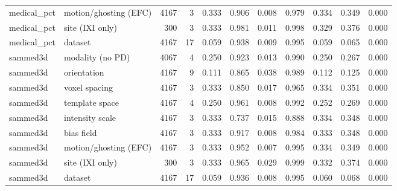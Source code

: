 \begin{tabular}{llrrrrrrrrr}
medical\_pct & motion/ghosting (EFC) & 4167 & 3 & 0.333 & 0.906 & 0.008 & 0.979 & 0.334 & 0.349 & 0.000 \\
medical\_pct & site (IXI only) & 300 & 3 & 0.333 & 0.981 & 0.011 & 0.998 & 0.329 & 0.376 & 0.000 \\
medical\_pct & dataset & 4167 & 17 & 0.059 & 0.938 & 0.009 & 0.995 & 0.059 & 0.065 & 0.000 \\
sammed3d & modality (no PD) & 4067 & 4 & 0.250 & 0.923 & 0.013 & 0.990 & 0.250 & 0.267 & 0.000 \\
sammed3d & orientation & 4167 & 9 & 0.111 & 0.865 & 0.038 & 0.989 & 0.112 & 0.125 & 0.000 \\
sammed3d & voxel spacing & 4167 & 3 & 0.333 & 0.850 & 0.017 & 0.965 & 0.334 & 0.351 & 0.000 \\
sammed3d & template space & 4167 & 4 & 0.250 & 0.961 & 0.008 & 0.992 & 0.252 & 0.269 & 0.000 \\
sammed3d & intensity scale & 4167 & 3 & 0.333 & 0.737 & 0.015 & 0.888 & 0.334 & 0.348 & 0.000 \\
sammed3d & bias field & 4167 & 3 & 0.333 & 0.917 & 0.008 & 0.984 & 0.333 & 0.348 & 0.000 \\
sammed3d & motion/ghosting (EFC) & 4167 & 3 & 0.333 & 0.952 & 0.007 & 0.995 & 0.334 & 0.349 & 0.000 \\
sammed3d & site (IXI only) & 300 & 3 & 0.333 & 0.965 & 0.029 & 0.999 & 0.332 & 0.374 & 0.000 \\
sammed3d & dataset & 4167 & 17 & 0.059 & 0.936 & 0.008 & 0.995 & 0.060 & 0.068 & 0.000 \\
\bottomrule
\end{tabular}

